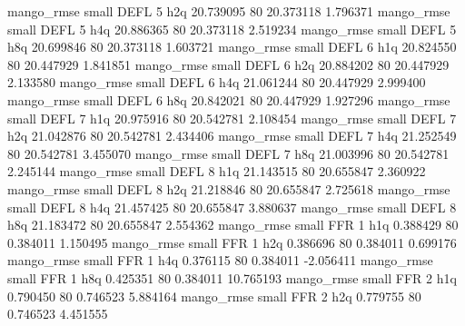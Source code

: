        mango_rmse      small     DEFL                 5                  h2q 20.739095 80      20.373118           1.796371
       mango_rmse      small     DEFL                 5                  h4q 20.886365 80      20.373118           2.519234
       mango_rmse      small     DEFL                 5                  h8q 20.699846 80      20.373118           1.603721
       mango_rmse      small     DEFL                 6                  h1q 20.824550 80      20.447929           1.841851
       mango_rmse      small     DEFL                 6                  h2q 20.884202 80      20.447929           2.133580
       mango_rmse      small     DEFL                 6                  h4q 21.061244 80      20.447929           2.999400
       mango_rmse      small     DEFL                 6                  h8q 20.842021 80      20.447929           1.927296
       mango_rmse      small     DEFL                 7                  h1q 20.975916 80      20.542781           2.108454
       mango_rmse      small     DEFL                 7                  h2q 21.042876 80      20.542781           2.434406
       mango_rmse      small     DEFL                 7                  h4q 21.252549 80      20.542781           3.455070
       mango_rmse      small     DEFL                 7                  h8q 21.003996 80      20.542781           2.245144
       mango_rmse      small     DEFL                 8                  h1q 21.143515 80      20.655847           2.360922
       mango_rmse      small     DEFL                 8                  h2q 21.218846 80      20.655847           2.725618
       mango_rmse      small     DEFL                 8                  h4q 21.457425 80      20.655847           3.880637
       mango_rmse      small     DEFL                 8                  h8q 21.183472 80      20.655847           2.554362
       mango_rmse      small      FFR                 1                  h1q  0.388429 80       0.384011           1.150495
       mango_rmse      small      FFR                 1                  h2q  0.386696 80       0.384011           0.699176
       mango_rmse      small      FFR                 1                  h4q  0.376115 80       0.384011          -2.056411
       mango_rmse      small      FFR                 1                  h8q  0.425351 80       0.384011          10.765193
       mango_rmse      small      FFR                 2                  h1q  0.790450 80       0.746523           5.884164
       mango_rmse      small      FFR                 2                  h2q  0.779755 80       0.746523           4.451555
